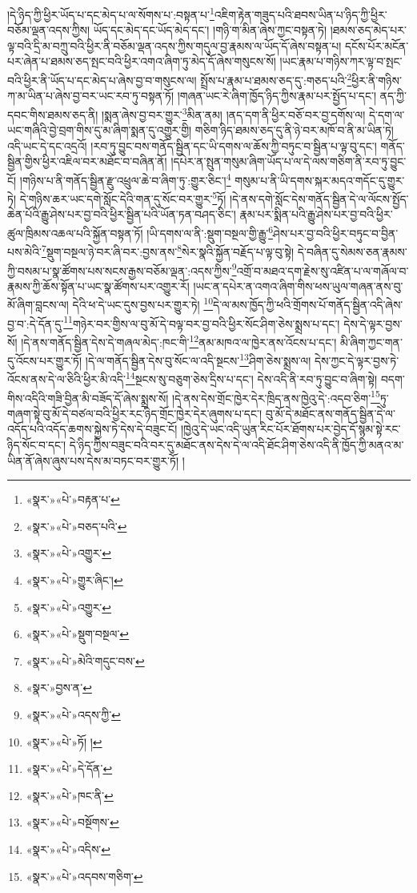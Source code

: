།དེ་ཉིད་ཀྱི་ཕྱིར་ཡོད་པ་དང་མེད་པ་ལ་སོགས་པ་:བསྟན་པ་\footnote{«སྣར་»«པེ་»བརྟན་པ་}འཇིག་རྟེན་གཟུད་པའི་ཐབས་ཡིན་པ་ཉིད་ཀྱི་ཕྱིར་བཅོམ་ལྡན་འདས་ཀྱིས། ཡོད་དང་མེད་དང་ཡོད་མེད་དང་། །གཉི་ག་མིན་ཞེས་ཀྱང་བསྟན་ཏེ། །ཐམས་ཅད་མེད་པར་ལྟ་བའི་དྲི་མ་བཀྲུ་བའི་ཕྱིར་ནི་བཅོམ་ལྡན་འདས་ཀྱིས་གདུལ་བྱ་རྣམས་ལ་ཡོད་དོ་ཞེས་བསྟན་པ། དངོས་པོར་མངོན་པར་ཞེན་པ་ཐམས་ཅད་སྤང་བའི་ཕྱིར་འགའ་ཞིག་ཏུ་མེད་དོ་ཞེས་གསུངས་སོ། །ཡང་རྣམ་པ་གཉིས་ཀར་ལྟ་བ་སྤང་བའི་ཕྱིར་ནི་ཡོད་པ་དང་མེད་པ་ཞེས་བྱ་བ་གསུངས་ལ། སྤྲོས་པ་རྣམ་པ་ཐམས་ཅད་དུ་:གཅད་པའི་\footnote{«སྣར་»«པེ་»བཅད་པའི་}ཕྱིར་ནི་གཉིས་ཀ་མ་ཡིན་པ་ཞེས་བྱ་བར་ཡང་རབ་ཏུ་བསྟན་ཏོ། །གཞན་ཡང་རེ་ཞིག་ཁྱོད་ཉིད་ཀྱིས་རྣམ་པར་སྤྱོད་པ་དང་། ནད་ཀྱི་དབང་གིས་ཐམས་ཅད་ནི། །སྨན་ཞེས་བྱ་བར་གྱུར་\footnote{«སྣར་»«པེ་»འགྱུར་}མིན་ནམ། །ནད་དག་ནི་ཕྱིར་བཅོ་བར་བྱ་དགོས་ལ། དེ་དག་ལ་ཡང་གཞིའི་བྱེ་བྲག་གིས་དུ་མ་ཞིག་སྨན་དུ་འགྱུར་གྱི། གཅིག་ཉིད་ཐམས་ཅད་དུ་ནི་ཉེ་བར་མཁོ་བ་ནི་མ་ཡིན་ཏེ། འདི་ཡང་དེ་དང་འདྲའོ། །རབ་ཏུ་བྱུང་བས་གནོད་སྦྱིན་དང་ཡི་དགས་ལ་ཆོས་ཀྱི་བཏུང་བ་སྦྱིན་པ་ལྟ་བུ་དང་། གནོད་སྦྱིན་གྱིས་ཕྱིར་འཇིལ་བར་མཐོང་བ་བཞིན་ནོ། །དཔེར་ན་སྤུན་གསུམ་ཞིག་ཡོད་པ་ལ་དེ་ལས་གཅིག་ནི་རབ་ཏུ་བྱུང་ངོ། །གཉིས་པ་ནི་གནོད་སྦྱིན་རྫུ་འཕྲུལ་ཆེ་བ་ཞིག་ཏུ་:གྱུར་ཅིང་།\footnote{«སྣར་»«པེ་»གྱུར་ཞིང་།} གསུམ་པ་ནི་ཡི་དགས་སྐར་མདའ་གདོང་དུ་གྱུར་ཏེ། དེ་གཉིས་ཆར་ཡང་དགེ་སློང་དེའི་གན་དུ་སོང་བར་གྱུར་\footnote{«སྣར་»«པེ་»འགྱུར་}ཏོ། །དེ་ནས་དགེ་སློང་དེས་གནོད་སྦྱིན་དེ་ལ་ལོངས་སྤྱོད་ཆེན་པོའི་རྒྱུ་ཤེས་པར་བྱ་བའི་ཕྱིར་སྦྱིན་པའི་ཡོན་ཏན་བཤད་ཅིང་། རྣམ་པར་སྨིན་པའི་རྒྱུ་ཤེས་པར་བྱ་བའི་ཕྱིར་ཚུལ་ཁྲིམས་འཆལ་པའི་སྐྱོན་བསྟན་ཏོ། །ཡི་དགས་ལ་ནི་:སྡུག་བསྔལ་གྱི་རྒྱུ་\footnote{«སྣར་»«པེ་»སྡུག་བསྔལ་}ཤེས་པར་བྱ་བའི་ཕྱིར་བཏུང་བ་བྱིན་པས་མེའི་\footnote{«སྣར་»«པེ་»མེའི་གདུང་བས་}སྡུག་བསྔལ་ཉེ་བར་ཞི་བར་:བྱས་ནས་\footnote{«སྣར་»བྱས་ན་}སེར་སྣའི་སྐྱོན་བརྗོད་པ་ལྟ་བུ་སྟེ། དེ་བཞིན་དུ་སེམས་ཅན་རྣམས་ཀྱི་བསམ་པ་སྣ་ཚོགས་པས་སངས་རྒྱས་བཅོམ་ལྡན་:འདས་ཀྱིས་\footnote{«སྣར་»«པེ་»འདས་ཀྱི་}འགྲོ་བ་མཐའ་དག་རྗེས་སུ་འཛིན་པ་ལ་གཞོལ་བ་རྣམས་ཀྱི་ཆོས་སྟོན་པ་ཡང་སྣ་ཚོགས་པར་འགྱུར་རོ། །ཡང་ན་དཔེར་ན་འགའ་ཞིག་གིས་ཕས་ཡུལ་གཞན་ནས་བུ་མོ་ཞིག་བླངས་ལ། དེའི་ཕ་དེ་ཡང་དུས་བྱས་པར་གྱུར་ཏེ། \footnote{«སྣར་»«པེ་»ཏོ། ། }དེ་ལ་མས་ཁྱོད་ཀྱི་ཕའི་གྲོགས་པོ་གནོད་སྦྱིན་འདི་ཞེས་བྱ་བ་:དེ་དོན་དུ་\footnote{«སྣར་»«པེ་»དེ་དོན་}གཉེར་བར་གྱིས་ལ་བུ་མོ་དེ་བལྟ་བར་བྱ་བའི་ཕྱིར་སོང་ཤིག་ཅེས་སྨྲས་པ་དང་། དེས་དེ་ལྟར་བྱས་སོ། །དེ་ནས་གནོད་སྦྱིན་དེས་དེ་གཞལ་མེད་:ཁང་གི་\footnote{«སྣར་»«པེ་»ཁང་ནི་}ནམ་མཁའ་ལ་ཁྱེར་ནས་འོངས་པ་དང་། མི་ཞིག་ཀྱང་གན་དུ་འོངས་པར་གྱུར་ཏོ། །དེ་ལ་གནོད་སྦྱིན་དེས་བུ་སོང་ལ་འདི་སྔངས་\footnote{«སྣར་»«པེ་»བསྔོགས་}ཤིག་ཅེས་སྨྲས་ལ། དེས་ཀྱང་དེ་ལྟར་བྱས་ཏེ་འོངས་ནས་དེ་ལ་ཅིའི་ཕྱིར་མི་འདི་\footnote{«སྣར་»«པེ་»འདིས་}སྔངས་སུ་བཅུག་ཅེས་དྲིས་པ་དང་། དེས་འདི་ནི་རབ་ཏུ་བྱུང་བ་ཞིག་སྟེ། བདག་གིས་འདིའི་གཟི་བྱིན་མི་བཟོད་དོ་ཞེས་སྨྲས་སོ། །དེ་ནས་དེས་གྲོང་ཁྱེར་དེར་ཁྲིད་ནས་ཁྱེའུ་དེ་:འདབ་ཅིག་\footnote{«སྣར་»«པེ་»འདབས་གཅིག་}ཏུ་གཞག་སྟེ་བུ་མོ་དེ་བཙལ་བའི་ཕྱིར་རང་ཉིད་གྲོང་ཁྱེར་དེར་ཞུགས་པ་དང་། བུ་མོ་དེ་མཐོང་ནས་གནོད་སྦྱིན་དེ་ལ་འདོད་པའི་འདོད་ཆགས་སྐྱེས་ཏེ་དེས་དེ་བཟུང་ངོ། །ཁྱེའུ་དེ་ཡང་འདི་ཡུན་རིང་པོར་ཐོགས་པར་བྱེད་དོ་སྙམ་སྟེ་རང་ཉིད་སོང་བ་དང་། དེ་ཉིད་ཀྱིས་བཟུང་བའི་བར་དུ་མཐོང་ནས་དེས་དེ་ལ་འདི་ཐོང་ཤིག་ཅེས་འདི་ནི་ཁྱོད་ཀྱི་མནའ་མ་ཡིན་ནོ་ཞེས་ཞུས་པས་དེས་མ་བཏང་བར་གྱུར་ཏོ། །

